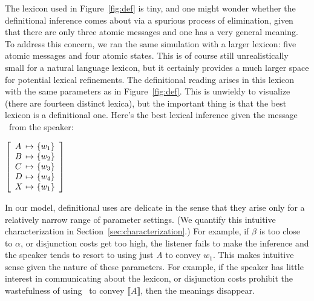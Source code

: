 \documentclass[12pt,twoside]{article}
\newcommand{\secref}[1]{Section~\ref{#1}}
\newcommand{\figref}[1]{Figure~\ref{#1}}
\newcommand{\word}[1]{\emph{#1}}
\newcommand{\set}[1]{\ensuremath{\left\{ #1 \right\}}}
\newcommand{\sem}[1]{\ensuremath{\llbracket#1\rrbracket}}
\renewcommand{\_}{\textbf{\textunderscore\hspace{-4pt}\textunderscore\hspace{-3pt}\textunderscore\hspace{-4pt}\textunderscore}\hspace{0.5pt}}			%
\begin{document}
The lexicon used in \figref{fig:def} is tiny, and one might wonder
whether the definitional inference comes about via a spurious process
of elimination, given that there are only three atomic messages and
one has a very general meaning. To address this concern, we ran the
same simulation with a larger lexicon: five atomic messages and four
atomic states. This is of course still unrealistically small for a
natural language lexicon, but it certainly provides a much larger
space for potential lexical refinements. The definitional reading
arises in this lexicon with the same parameters as in
\figref{fig:def}. This is unwieldy to visualize (there are fourteen
distinct lexica), but the important thing is that the best lexicon is
a definitional one. Here's the best lexical inference given the
message \AorX\ from the speaker:
%
\begin{exe}
\ex\label{def-lex-large}
  $\left[
    \begin{array}[c]{l@{ \ \mapsto \ }l}
      A & \set{w_{1}} \\
      B & \set{w_{2}} \\
      C & \set{w_{3}} \\
      D & \set{w_{4}} \\
      X & \set{w_{1}}
    \end{array}
  \right]$
\end{exe}

In our model, definitional uses are delicate in the sense that they
arise only for a relatively narrow range of parameter settings. (We
quantify this intuitive characterization in
\secref{sec:characterization}.) For example, if $\beta$ is too close
to $\alpha$, or disjunction costs get too high, the listener fails to
make the inference and the speaker tends to resort to using just
\word{A} to convey $w_{1}$. This makes intuitive sense given
the nature of these parameters. For example, if the speaker has little
interest in communicating about the lexicon, or disjunction costs
prohibit the wastefulness of using \AorX\ to convey
$\sem{A}$, then the meanings disappear.
\end{document}
